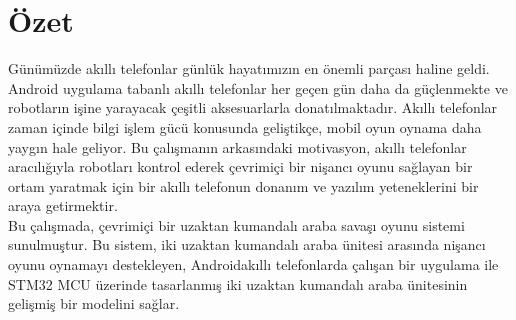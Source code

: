 \chapter*{Özet}


Günümüzde akıllı telefonlar günlük hayatımızın en önemli parçası haline geldi. Android uygulama tabanlı akıllı telefonlar her geçen gün daha da güçlenmekte ve robotların işine yarayacak çeşitli aksesuarlarla donatılmaktadır. Akıllı telefonlar zaman içinde bilgi işlem gücü konusunda geliştikçe, mobil oyun oynama daha yaygın hale geliyor. Bu çalışmanın arkasındaki motivasyon, akıllı telefonlar aracılığıyla robotları kontrol ederek çevrimiçi bir nişancı oyunu sağlayan bir ortam yaratmak için bir akıllı telefonun donanım ve yazılım yeteneklerini bir araya getirmektir.\\

Bu çalışmada, çevrimiçi bir uzaktan kumandalı araba savaşı oyunu sistemi sunulmuştur. Bu sistem, iki uzaktan kumandalı araba ünitesi arasında nişancı oyunu oynamayı destekleyen, Android\texttrademark\;akıllı telefonlarda çalışan bir uygulama ile STM32 MCU üzerinde tasarlanmış iki uzaktan kumandalı araba ünitesinin gelişmiş bir modelini sağlar.

\vfill
\clearpage